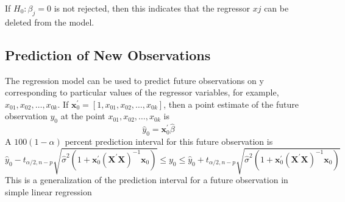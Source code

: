 \documentclass[12pt]{article}
\numberwithin{equation}{section}
\begin{document}
\noindent If $H_0:\beta_j = 0$ is not rejected, then this indicates that the regressor $xj$ can be deleted from the model. 

\subsection{Prediction of New Observations}

The regression model can be used to predict future observations on y corresponding to particular values of the regressor variables, for example, $x_{01}, x_{02}, \ldots, x_{0 k}$. If $\boldsymbol{x}_0^{\prime}=\left[1, x_{01}, x_{02}, \ldots, x_{0 k}\right]$, then a point estimate of the future observation $y_0$ at the point $x_{01}, x_{02}, \ldots, x_{0 k}$ is
$$\hat{y}_0=\mathbf{x}_0^{\prime} \hat{\beta}$$
\noindent A $100(1-\alpha)$ percent prediction interval for this future observation is
$$\hat{y}_0-t_{\alpha / 2, n-p} \sqrt{\hat{\sigma}^2\left(1+\mathbf{x}_0^{\prime}\left(\mathbf{X}^{\prime} \mathbf{X}\right)^{-1} \mathbf{x}_0\right)} \leq y_0 \leq \hat{y}_0+t_{\alpha / 2, n-p} \sqrt{\hat{\sigma}^2\left(1+\mathbf{x}_0^{\prime}\left(\mathbf{X}^{\prime} \mathbf{X}\right)^{-1} \mathbf{x}_0\right)}$$
This is a generalization of the prediction interval for a future observation in simple linear regression
\end{document}
